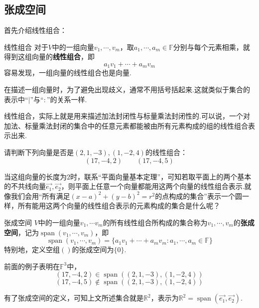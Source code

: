 \documentclass[lang=cn, zihao=5]{elegantbook}
\newcommand{\xl}[1]{\overrightarrow{#1}}
\newcommand{\R}{\mathbb{R}}
\newcommand{\F}{\mathbb{F}}
\DeclareMathOperator{\spn}{span}
\begin{document}
\subsection{张成空间}

首先介绍线性组合：

\begin{definition}{线性组合}
	对于$V$中的一组向量$v_1, \cdots ,v_m$，取$a_1, \cdots ,a_m \in \F$分别与每个元素相乘，就得到这组向量的\textbf{线性组合}，即$$a_1v_1 + \cdots + a_mv_m$$
	容易发现，一组向量的线性组合也是向量.
\end{definition}
\begin{remark}
	在描述一组向量时，为了避免出现歧义，通常不用括号括起来.这就类似于集合的表示中“$|$”与“$:$”的关系一样.
\end{remark}
\begin{remark}
	线性组合，实际上就是用来描述加法封闭性与标量乘法封闭性的.可以说，一个对加法、标量乘法封闭的集合中的任意元素都能被由所有元素构成的组的线性组合表示出来.
\end{remark}

\begin{example}
	请判断下列向量是否是$(2,1,-3),(1,-2,4)$的线性组合：
	$$(17,-4,2) \qquad (17,-4,5)$$
\end{example}

当这组向量的长度为$2$时，联系“平面向量基本定理”，可知若取平面上的两个基本的不共线向量$\xl{e_1},\xl{e_2}$，则平面上任意一个向量都能用这两个向量的线性组合表示.就像我们会用“所有满足$(x-a)^2+(y-b)^2=r^2$的点构成的集合”表示一个圆一样，所有能用这两个向量的线性组合表示的元素构成的集合是什么呢？

\begin{definition}{张成空间}
	$V$中的一组向量$v_1, \cdots v_m$的所有线性组合所构成的集合称为$v_1 , \cdots ,v_m$的\textbf{张成空间}，记为$\spn (v_1, \cdots ,v_m)$，即$$\spn (v_1, \cdots ,v_m) = \{ a_1v_1 + \cdots + a_mv_m : a_1 ,\cdots ,a_m \in \F \}$$
	特别地，定义空组$()$的张成空间为$\{ 0 \}$.
\end{definition}

\begin{example}
	前面的例子表明在$\F ^3$中，
	$$(17,-4,2) \in \spn ((2,1,-3),(1,-2,4))$$
	$$(17,-4,5) \notin \spn ((2,1,-3),(1,-2,4))$$
\end{example}

有了张成空间的定义，可知上文所述集合就是$\R ^2$，表示为$\R ^2 = \spn (\xl{e_1},\xl{e_2})$.
\end{document}
